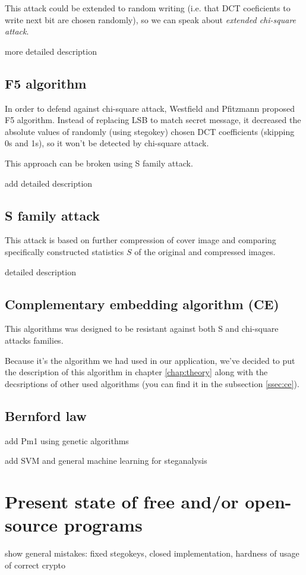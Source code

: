 This attack could be extended to random writing (i.e. that DCT coeficients to write next bit
are chosen randomly), so we can speak about \textit{extended chi-square attack}.

\TODO more detailed description

\subsection{F5 algorithm}

In order to defend against chi-square attack, Westfield and Pfitzmann proposed F5 algorithm.
Instead of replacing LSB to match secret message, it decreased the absolute values of randomly 
(using stegokey) chosen DCT coefficients (skipping 0s and 1s), so it won't be detected by
chi-square attack.

This approach can be broken using S family attack.

\TODO add detailed description

\subsection{S family attack}

This attack is based on further compression of cover image and comparing 
specifically constructed statistics $S$ of the original and compressed images.

\TODO detailed description

\subsection{Complementary embedding algorithm (CE)}

This algorithms was designed to be resistant against both S and chi-square attacks families.

Because it's the algorithm we had used in our application, 
we've decided to put the description of this algorithm in chapter \ref{chap:theory}
along with the decsriptions of other used algorithms (you can find it in the subsection
\ref{ssec:ce}).

\subsection{Bernford law}

\TODO 

\TODO add Pm1 using genetic algorithms

\TODO add SVM and general machine learning for steganalysis

\section{Present state of free and/or open-source programs}

\TODO show general mistakes: fixed stegokeys, closed implementation, hardness of usage of correct crypto
